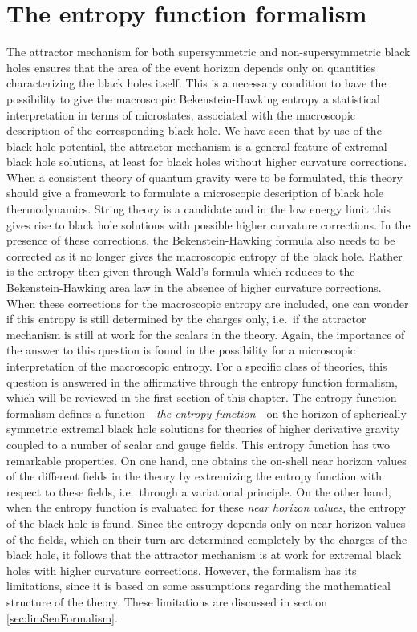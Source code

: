 \documentclass[12pt,twoside]{book}
\begin{document}
\chapter{The entropy function formalism}
\label{ch:entrFunc}

The attractor mechanism for both supersymmetric and non-supersymmetric black holes ensures that the area of the event horizon depends only on quantities characterizing the black holes itself. This is a necessary condition to have the possibility to give the macroscopic Bekenstein-Hawking entropy a statistical interpretation in terms of microstates, associated with the macroscopic description of the corresponding black hole. We have seen that by use of the black hole potential, the attractor mechanism is a general feature of extremal black hole solutions, at least for black holes without higher curvature corrections. When a consistent theory of quantum gravity were to be formulated, this theory should give a framework to formulate a microscopic description of black hole thermodynamics. String theory is a candidate and in the low energy limit this gives rise to black hole solutions with possible higher curvature corrections. In the presence of these corrections, the Bekenstein-Hawking formula also needs to be corrected as it no longer gives the macroscopic entropy of the black hole. Rather is the entropy then given through Wald's formula which reduces to the Bekenstein-Hawking area law in the absence of higher curvature corrections. When these corrections for the macroscopic entropy are included, one can wonder if this entropy is still determined by the charges only, i.e.\ if the attractor mechanism is still at work for the scalars in the theory. Again, the importance of the answer to this question is found in the possibility for a microscopic interpretation of the macroscopic entropy. For a specific class of theories, this question is answered in the affirmative through the entropy function formalism, which will be reviewed in the first section of this chapter. The entropy function formalism defines a function---\emph{the entropy function}---on the horizon of spherically symmetric extremal black hole solutions for theories of higher derivative gravity coupled to a number of scalar and gauge fields. This entropy function has two remarkable properties. On one hand, one obtains the on-shell near horizon values of the different fields in the theory by extremizing the entropy function with respect to these fields, i.e.\ through a variational principle. On the other hand, when the entropy function is evaluated for these \emph{near horizon values}, the entropy of the black hole is found. Since the entropy depends only on near horizon values of the fields, which on their turn are determined completely by the charges of the black hole, it follows that the attractor mechanism is at work for extremal black holes with higher curvature corrections. However, the formalism has its limitations, since it is based on some assumptions regarding the mathematical structure of the theory. These limitations are discussed in section \ref{sec:limSenFormalism}.
\end{document}
